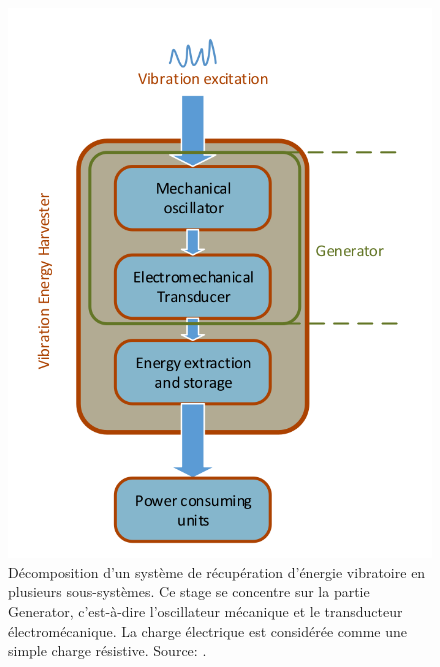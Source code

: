 \documentclass[a4paper, french, 12pt, titlepage]{article}
\begin{document}
\begin{figure}[H]
  \begin{center}
    \includegraphics[width = .35\textwidth]{images/weiqun_lui_harvester}
  \end{center}
  \caption{Décomposition d'un système de récupération d'énergie vibratoire en plusieurs sous-systèmes.
    Ce stage se concentre sur la partie \og{}Generator\fg{}, c'est-à-dire l'oscillateur mécanique et le transducteur électromécanique.
    La charge électrique est considérée comme une simple charge résistive. Source:  \cite{Liu2014}.}
  \label{fig:wl_subsystems}
\end{figure}
\end{document}
